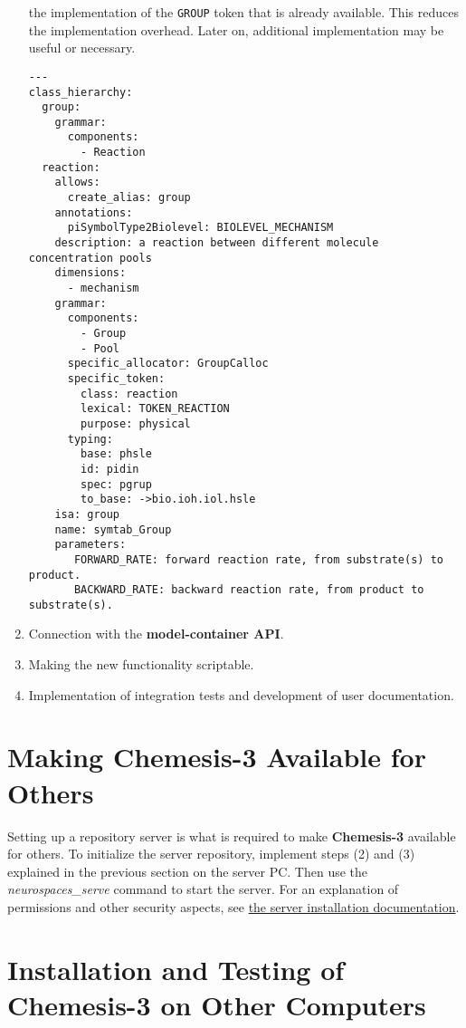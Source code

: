\documentclass[12pt]{article}
\begin{document}
\begin{enumerate}
  the implementation of the {\tt GROUP} token that is already
  available.  This reduces the implementation overhead.  Later on,
  additional implementation may be useful or necessary.
\begin{verbatim}
---
class_hierarchy:
  group:
    grammar:
      components:
        - Reaction
  reaction:
    allows:
      create_alias: group
    annotations:
      piSymbolType2Biolevel: BIOLEVEL_MECHANISM
    description: a reaction between different molecule concentration pools
    dimensions:
      - mechanism
    grammar:
      components:
        - Group
        - Pool
      specific_allocator: GroupCalloc
      specific_token:
        class: reaction
        lexical: TOKEN_REACTION
        purpose: physical
      typing:
        base: phsle
        id: pidin
        spec: pgrup
        to_base: ->bio.ioh.iol.hsle
    isa: group
    name: symtab_Group
    parameters:
       FORWARD_RATE: forward reaction rate, from substrate(s) to product.
       BACKWARD_RATE: backward reaction rate, from product to substrate(s).
\end{verbatim}
\item Connection with the {\bf model-container API}.
\item Making the new functionality scriptable.
\item Implementation of integration tests and development of user
  documentation.
\end{enumerate}


\section*{Making {\bf Chemesis-3} Available for Others}

Setting up a repository server is what is required to make {\bf
  Chemesis-3} available for others.  To initialize the server
repository, implement steps (2) and (3) explained in the previous
section on the server PC.  Then use the {\it neurospaces\_serve}
command to start the server.  For an explanation of permissions and
other security aspects, see
\href{../installation-debian-server/installation-debian-server.html}{the
  server installation documentation}.


\section*{Installation and Testing of {\bf Chemesis-3} on Other Computers}
\end{document}
